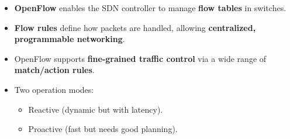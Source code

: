 \highspace
\begin{takeawaysbox}
    \begin{itemize}
        \item \textbf{OpenFlow} enables the SDN controller to manage \textbf{flow tables} in switches.
        \item \textbf{Flow rules} define how packets are handled, allowing \textbf{centralized, programmable networking}.
        \item OpenFlow supports \textbf{fine-grained traffic control} via a wide range of \textbf{match/action rules}.
        \item Two operation modes:
        \begin{itemize}
            \item Reactive (dynamic but with latency).
            \item Proactive (fast but needs good planning).
        \end{itemize}
    \end{itemize}
\end{takeawaysbox}